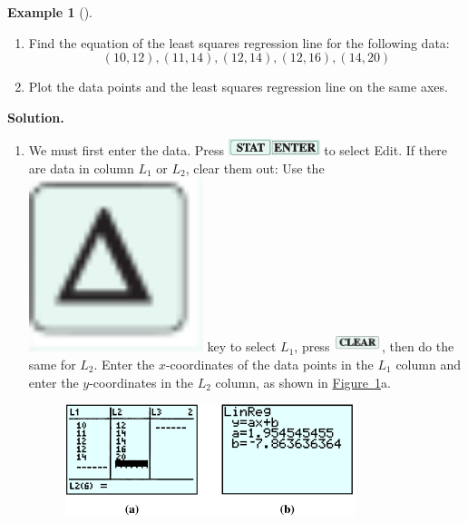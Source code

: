 \documentclass[10pt,]{book}
\theoremstyle{plain}
\theoremstyle{definition}
\theoremstyle{definition}
\newtheorem{example}[theorem]{Example}
\numberwithin{equation}{section}
\begin{document}
\begin{example}[]\label{example-GC-regression}
\leavevmode%
\begin{enumerate}[label=*\alph**]
\item\hypertarget{li-212}{}Find the equation of the least squares regression line for the following data:
            \begin{equation*}(10, 12), (11, 14), (12, 14), (12, 16), (14, 20)\end{equation*}\item\hypertarget{li-213}{}Plot the data points and the least squares regression line on the same axes.\end{enumerate}
\par\medskip\noindent%
\textbf{Solution.}\quad \leavevmode%
\begin{enumerate}[label=*\alph**]
\item\hypertarget{li-214}{}We must first enter the data. Press \includegraphics[width=0.10\textwidth,]{images/icon-stat.svg}\includegraphics[width=0.11\textwidth,]{images/icon-enter.svg} to select Edit. If there are data in column \(L_1\) or \(L_2\), clear them out: Use the \includegraphics[width=0.4\textwidth,]{images/icon-up.svg} key to select \(L_1\), press \includegraphics[width=0.11\textwidth,]{images/icon-clear.svg}, then do the same for \(L_2\). Enter the \(x\)-coordinates of the data points in the \(L_1\) column and enter the \(y\)-coordinates in the \(L_2\) column, as shown in \hyperref[fig-GC-regression]{Figure~\ref{fig-GC-regression}}a.
        \leavevmode%
\begin{figure}
\centering
\includegraphics[width=0.80\textwidth,]{images/fig-GC-regression.svg}\caption{\label{fig-GC-regression}}
\end{figure}


\end{enumerate}
\end{example}
\end{document}
